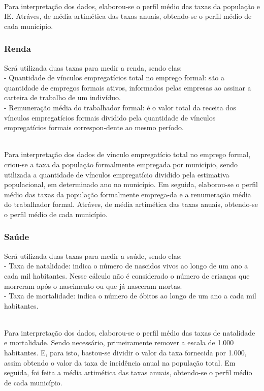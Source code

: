 \documentclass[a4paper, 10pt]{article}
\begin{document}
    \\
    Para interpretação dos dados, elaborou-se o perfil médio das taxas da população e IE. Atráves, de média artimética das taxas anuais, obtendo-se o perfil médio de cada município.
	
    \subsubsection{Renda}
     Será utilizada duas taxas para medir a renda, sendo elas:
     \\
     \noindent
	- Quantidade de vínculos empregatícios total no emprego formal: são a quantidade de empregos formais ativos, informados pelas empresas ao assinar a carteira de trabalho de um indivíduo.
	\\
	- Remuneração média do trabalhador formal: é o valor total da receita dos vínculos empregatícios formais dividido pela quantidade de vínculos empregatícios formais correspon-dente ao mesmo período.
	
	\\
	Para interpretação dos dados de vínculo empregatício total no emprego formal, criou-se a taxa da população formalmente empregada por município, sendo utilizada a quantidade de vínculos empregatício dividido pela estimativa populacional, em determinado ano no município. Em seguida, elaborou-se o perfil médio das taxas da população formalmente emprega-da e a renumeração média do trabalhador formal. Atráves, de média artimética das taxas anuais, obtendo-se o perfil médio de cada município.

    \subsubsection{Saúde}
     Será utilizada duas taxas para medir a saúde, sendo elas:
     \\
    \noindent
	- Taxa de natalidade: indica o número de nascidos vivos ao longo de um ano a cada mil habitantes. Nesse cálculo não é considerado o número de crianças que morreram após o nascimento ou que já nasceram mortas.
	\\
	- Taxa de mortalidade: indica o número de óbitos ao longo de um ano a cada mil habitantes.
	
\\
Para interpretação dos dados, elaborou-se o perfil médio das taxas de natalidade e mortalidade. Sendo necessário, primeiramente remover a escala de 1.000 habitantes. E, para isto, bastou-se dividir o valor da taxa fornecida por 1.000, assim obtendo o valor da taxa de incidência anual na população total. Em seguida, foi feita a média artimética das taxas anuais, obtendo-se o perfil médio de cada município.
	
\end{document}
